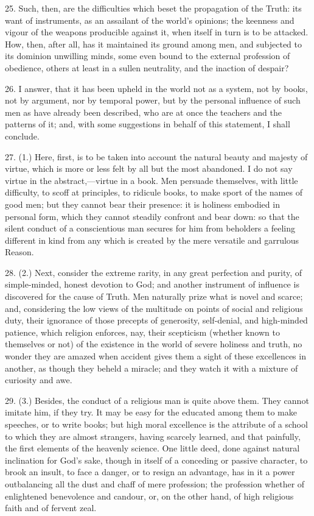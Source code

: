 25. Such, then, are the difficulties which beset the propagation of
the Truth: its want of instruments, as an assailant of the world's
opinions; the keenness and vigour of the weapons producible against
it, when itself in turn is to be attacked. How, then, after all, has
it maintained its ground among men, and subjected to its dominion
unwilling minds, some even bound to the external profession of
obedience, others at least in a sullen neutrality, and the inaction of
despair?

26. I answer, that it has been upheld in the world not as a system,
not by books, not by argument, nor by temporal power, but by the
personal influence of such men as have already been described, who are
at once the teachers and the patterns of it; and, with some
suggestions in behalf of this statement, I shall conclude.

27. (1.) Here, first, is to be taken into account the natural
beauty and majesty of virtue, which is more or less felt by all but
the most abandoned. I do not say virtue in the abstract,—virtue in a
book. Men persuade themselves, with little difficulty, to scoff at
principles, to ridicule books, to make sport of the names of good men;
but they cannot bear their presence: it is holiness embodied in
personal form, which they cannot steadily confront and bear down: so
that the silent conduct of a conscientious man secures for him from
beholders a feeling different in kind from any which is created by the
mere versatile and garrulous Reason.

28. (2.) Next, consider the extreme rarity, in any great perfection
and purity, of simple-minded, honest devotion to God; and another
instrument of influence is discovered for the cause of Truth. Men
naturally prize what is novel and scarce; and, considering the low
views of the multitude on points of social and religious duty, their
ignorance of those precepts of generosity, self-denial, and
high-minded patience, which religion enforces, nay, their scepticism
(whether known to themselves or not) of the existence in the world of
severe holiness and truth, no wonder they are amazed when accident
gives them a sight of these excellences in another, as though they
beheld a miracle; and they watch it with a mixture of curiosity and
awe.

29. (3.) Besides, the conduct of a religious man is quite above
them. They cannot imitate him, if they try. It may be easy for the
educated among them to make speeches, or to write books; but high
moral excellence is the attribute of a school to which they are almost
strangers, having scarcely learned, and that painfully, the first
elements of the heavenly science. One little deed, done against
natural inclination for God's sake, though in itself of a conceding or
passive character, to brook an insult, to face a danger, or to resign
an advantage, has in it a power outbalancing all the dust and chaff of
mere profession; the profession whether of enlightened benevolence and
candour, or, on the other hand, of high religious faith and of fervent
zeal.

